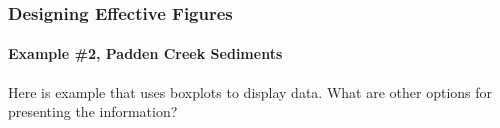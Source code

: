 \documentclass[10pt]{beamer}
\begin{document}
\begin{frame}
\frametitle{Designing Effective Figures}
\framesubtitle{Example \#2, Padden Creek Sediments}

\begin{center}
\end{center}

\vspace*{-2ex}
{\scriptsize Here is example that uses boxplots to display data.  What are other options for presenting the information?\\}
\end{frame}
\end{document}
